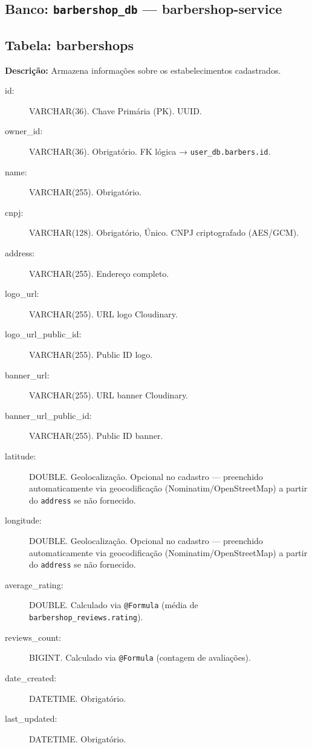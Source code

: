 \documentclass[
    12pt, 
    a4paper, 
    oneside, 
    chapter=TITLE, 
    section=TITLE
]{abntex2}
\begin{document}
\begin{apendicesenv}
\section*{Banco: \texttt{barbershop\_db} — barbershop-service}

\subsection*{Tabela: barbershops}
\textbf{Descrição:} Armazena informações sobre os estabelecimentos cadastrados.
\begin{description}
    \item[id:] VARCHAR(36). Chave Primária (PK). UUID.
    \item[owner\_id:] VARCHAR(36). Obrigatório. FK lógica → \texttt{user\_db.barbers.id}.
    \item[name:] VARCHAR(255). Obrigatório.
    \item[cnpj:] VARCHAR(128). Obrigatório, Único. CNPJ criptografado (AES/GCM).
    \item[address:] VARCHAR(255). Endereço completo.
    \item[logo\_url:] VARCHAR(255). URL logo Cloudinary.
    \item[logo\_url\_public\_id:] VARCHAR(255). Public ID logo.
    \item[banner\_url:] VARCHAR(255). URL banner Cloudinary.
    \item[banner\_url\_public\_id:] VARCHAR(255). Public ID banner.
    \item[latitude:] DOUBLE. Geolocalização. Opcional no cadastro — preenchido automaticamente via geocodificação (Nominatim/OpenStreetMap) a partir do \texttt{address} se não fornecido.
    \item[longitude:] DOUBLE. Geolocalização. Opcional no cadastro — preenchido automaticamente via geocodificação (Nominatim/OpenStreetMap) a partir do \texttt{address} se não fornecido.
    \item[average\_rating:] DOUBLE. Calculado via \texttt{@Formula} (média de \texttt{barbershop\_reviews.rating}).
    \item[reviews\_count:] BIGINT. Calculado via \texttt{@Formula} (contagem de avaliações).
    \item[date\_created:] DATETIME. Obrigatório.
    \item[last\_updated:] DATETIME. Obrigatório.
\end{description}


\end{apendicesenv}
\end{document}

